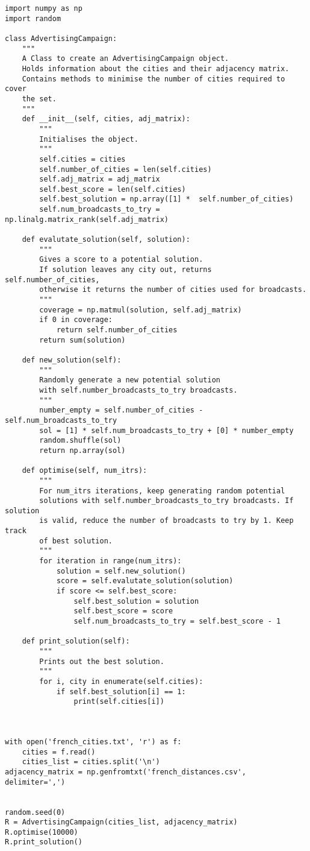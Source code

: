 \documentclass[border={10pt, 10pt, 10pt, 10pt}, varwidth=14cm]{standalone}
\begin{document}
\begin{verbatim}
import numpy as np
import random

class AdvertisingCampaign:
    """
    A Class to create an AdvertisingCampaign object.
    Holds information about the cities and their adjacency matrix.
    Contains methods to minimise the number of cities required to cover
    the set.
    """
    def __init__(self, cities, adj_matrix):
        """
        Initialises the object.
        """
        self.cities = cities
        self.number_of_cities = len(self.cities)
        self.adj_matrix = adj_matrix
        self.best_score = len(self.cities)
        self.best_solution = np.array([1] *  self.number_of_cities)
        self.num_broadcasts_to_try = np.linalg.matrix_rank(self.adj_matrix)
    
    def evalutate_solution(self, solution):
        """
        Gives a score to a potential solution.
        If solution leaves any city out, returns self.number_of_cities,
        otherwise it returns the number of cities used for broadcasts.
        """
        coverage = np.matmul(solution, self.adj_matrix)
        if 0 in coverage:
            return self.number_of_cities
        return sum(solution)
    
    def new_solution(self):
        """
        Randomly generate a new potential solution
        with self.number_broadcasts_to_try broadcasts.
        """
        number_empty = self.number_of_cities - self.num_broadcasts_to_try
        sol = [1] * self.num_broadcasts_to_try + [0] * number_empty
        random.shuffle(sol)
        return np.array(sol)
    
    def optimise(self, num_itrs):
        """
        For num_itrs iterations, keep generating random potential
        solutions with self.number_broadcasts_to_try broadcasts. If solution
        is valid, reduce the number of broadcasts to try by 1. Keep track
        of best solution.
        """
        for iteration in range(num_itrs):
            solution = self.new_solution()
            score = self.evalutate_solution(solution)
            if score <= self.best_score:
                self.best_solution = solution
                self.best_score = score
                self.num_broadcasts_to_try = self.best_score - 1
    
    def print_solution(self):
        """
        Prints out the best solution.
        """
        for i, city in enumerate(self.cities):
            if self.best_solution[i] == 1:
                print(self.cities[i])



with open('french_cities.txt', 'r') as f:
    cities = f.read()
    cities_list = cities.split('\n')
adjacency_matrix = np.genfromtxt('french_distances.csv', delimiter=',')


random.seed(0)
R = AdvertisingCampaign(cities_list, adjacency_matrix)
R.optimise(10000)
R.print_solution()

\end{verbatim}
\end{document}

